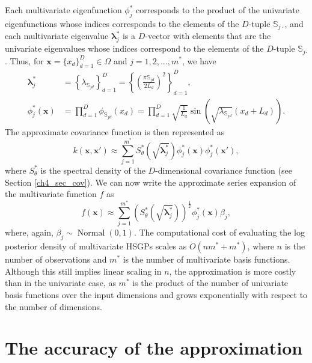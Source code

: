 \documentclass[onecolumn,a4paper,11pt]{article}
\DeclareMathOperator{\Normal}{Normal}
\begin{document}
Each multivariate eigenfunction $\phi^{\ast}_j$ corresponds to the product of the univariate eigenfunctions whose indices corresponds to the elements of the $D$-tuple $\mathbb{S}_{j\cdotp}$, and each multivariate eigenvalue $\bm{\lambda}^{\ast}_j$ is a $D$-vector with elements that are the univariate eigenvalues whose indices correspond to the elements of the $D$-tuple $\mathbb{S}_{j\bm{\cdotp}}$. Thus, for $\bm{x}=\{x_d\}_{d=1}^D \in \Omega$ and $j=1,2,\ldots,m^{\ast}$, we have 
%
\begin{align}
\bm{\lambda}^{\ast}_j &= \left\{ \lambda_{\mathbb{S}_{jd}} \right\}_{d=1}^D =  \left\{ \left(\frac{\pi \mathbb{S}_{jd}}{2L_d}\right)^{\!2} \right\}_{d=1}^D, \label{eq_eigenvalue_multi} \\
%
\phi^{\ast}_j(\bm{x}) &= \prod_{d=1}^{D} \phi_{\mathbb{S}_{jd}}(x_d) = \prod_{d=1}^{D} \sqrt{\frac{1}{L_d}} \sin\!\left(\sqrt{\lambda_{\mathbb{S}_{jd}}}(x_d+L_d)\right). \label{eq_eigenfunction_multi}
\end{align}
%
The approximate covariance function is then represented as
%
\begin{equation}\label{eq_approxcov_multi}
k(\bm{x},\bm{x}') \approx \sum_{j=1}^{m^{\ast}} 
S^{\ast}_{\theta}\left(\sqrt{\bm{\lambda}^{\ast}_j}\right)
\phi^{\ast}_j(\bm{x}) \phi^{\ast}_j(\bm{x}'),
\end{equation}
%
where $S^{\ast}_{\theta}$ is the spectral density of the $D$-dimensional covariance function (see Section \ref{ch4_sec_cov}). We can now write the approximate series expansion of the multivariate function $f$ as
%
\begin{equation}\label{eq_approxf_multi}
f(\bm{x}) \approx \sum_{j=1}^{m^{\ast}} 
\left( S^{\ast}_{\theta} \left(\sqrt{\bm{\lambda}^{\ast}_j} \right)\right)^{\! \frac{1}{2}} \phi^{\ast}_j(\bm{x}) \beta_j, 
\end{equation}
%
where, again, $\beta_j \sim \Normal(0,1)$. The computational cost of evaluating the log posterior density of multivariate HSGPs scales as $O(n m^{\ast} + m^{\ast})$, where $n$ is the number of observations and $m^{\ast}$ is the number of multivariate basis functions. Although this still implies linear scaling in $n$, the approximation is more costly than in the univariate case, as $m^{\ast}$ is the product of the number of univariate basis functions over the input dimensions and grows exponentially with respect to the number of  dimensions.


\section{The accuracy of the approximation}\label{ch5_sec_accuracy}
\end{document}
